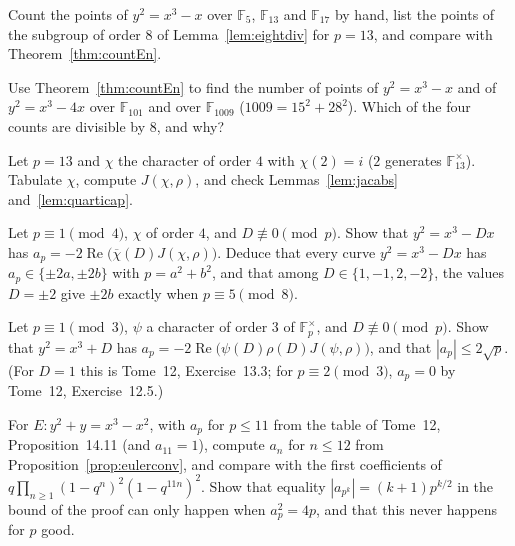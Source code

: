 \begin{exercise}[$\star$]\label{ex:handcount}
Count the points of $y^2=x^3-x$ over $\mathbb F_5$, $\mathbb F_{13}$ and $\mathbb F_{17}$ by hand, list the points of the subgroup of order $8$ of
Lemma~\ref{lem:eightdiv} for $p=13$, and compare with Theorem~\ref{thm:countEn}.
\end{exercise}

\begin{exercise}[$\star$]\label{ex:bigp}
Use Theorem~\ref{thm:countEn} to find the number of points of $y^2=x^3-x$ and of $y^2=x^3-4x$ over $\mathbb F_{101}$ and over $\mathbb F_{1009}$
($1009=15^2+28^2$). Which of the four counts are divisible by $8$, and why?
\end{exercise}

\begin{exercise}[$\star\star$]\label{ex:jac13}
Let $p=13$ and $\chi$ the character of order $4$ with $\chi(2)=i$ ($2$ generates $\mathbb F_{13}^\times$). Tabulate $\chi$, compute $J(\chi,\rho)$, and check
Lemmas~\ref{lem:jacabs} and~\ref{lem:quarticap}.
\end{exercise}

\begin{exercise}[$\star\star$]\label{ex:quarticD}
Let $p\equiv1\pmod4$, $\chi$ of order $4$, and $D\not\equiv0\pmod p$. Show that $y^2=x^3-Dx$ has $a_p=-2\operatorname{Re}\bigl(\overline\chi(D)J(\chi,\rho)\bigr)$.
Deduce that every curve $y^2=x^3-Dx$ has $a_p\in\{\pm2a,\pm2b\}$ with $p=a^2+b^2$, and that among $D\in\{1,-1,2,-2\}$, the values $D=\pm2$ give $\pm2b$ exactly when
$p\equiv5\pmod8$.
\end{exercise}

\begin{exercise}[$\star\star$]\label{ex:cubicD}
Let $p\equiv1\pmod3$, $\psi$ a character of order $3$ of $\mathbb F_p^\times$, and $D\not\equiv0\pmod p$. Show that $y^2=x^3+D$ has
$a_p=-2\operatorname{Re}\bigl(\psi(D)\rho(D)J(\psi,\rho)\bigr)$, and that $|a_p|\le2\sqrt p$. (For $D=1$ this is Tome~12, Exercise~13.3; for $p\equiv2\pmod3$,
$a_p=0$ by Tome~12, Exercise~12.5.)
\end{exercise}

\begin{exercise}[$\star\star$]\label{ex:anbound}
For $E:y^2+y=x^3-x^2$, with $a_p$ for $p\le11$ from the table of Tome~12, Proposition~14.11 (and $a_{11}=1$), compute $a_n$ for $n\le12$ from
Proposition~\ref{prop:eulerconv}, and compare with the first coefficients of $q\prod_{n\ge1}(1-q^n)^2(1-q^{11n})^2$. Show that equality $|a_{p^k}|=(k+1)p^{k/2}$
in the bound of the proof can only happen when $a_p^2=4p$, and that this never happens for $p$ good.
\end{exercise}

